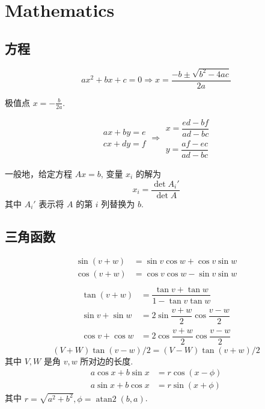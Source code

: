 
\chapter{Mathematics}

\section{方程}
\[ax^2+bx+c=0 \Rightarrow x = \frac{-b\pm\sqrt{b^2-4ac}}{2a}\]

极值点 $x = -\frac{b}{2a}$.

\[\begin{aligned}ax+by=e\\cx+dy=f\end{aligned}
\Rightarrow
\begin{aligned}x=\dfrac{ed-bf}{ad-bc}\\y=\dfrac{af-ec}{ad-bc}\end{aligned}\]

一般地，给定方程 $Ax = b$, 变量 $x_i$ 的解为
\[x_i = \frac{\det A_i'}{\det A} \]
其中 $A_i'$ 表示将 $A$ 的第 $i$ 列替换为 $b$.


\section{三角函数}
\begin{align*}
\sin(v+w)&{}=\sin v\cos w+\cos v\sin w\\
\cos(v+w)&{}=\cos v\cos w-\sin v\sin w\\
\end{align*}
\begin{align*}
\tan(v+w)&{}=\dfrac{\tan v+\tan w}{1-\tan v\tan w}\\
\sin v+\sin w&{}=2\sin\dfrac{v+w}{2}\cos\dfrac{v-w}{2}\\
\cos v+\cos w&{}=2\cos\dfrac{v+w}{2}\cos\dfrac{v-w}{2}
\end{align*}
\[ (V+W)\tan(v-w)/2{}=(V-W)\tan(v+w)/2 \]
其中 $V, W$ 是角 $v, w$ 所对边的长度.
\begin{align*}
	a\cos x+b\sin x&=r\cos(x-\phi)\\
	a\sin x+b\cos x&=r\sin(x+\phi)
\end{align*}
其中 $r=\sqrt{a^2+b^2}, \phi=\operatorname{atan2}(b,a)$.

